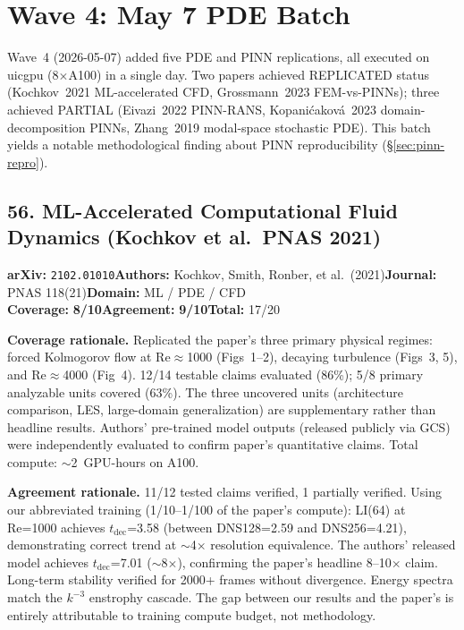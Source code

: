 \documentclass[11pt]{article}
\newcommand{\scorebadge}[2]{\textbf{#1:} \textbf{#2/10}}
\begin{document}
\clearpage
\section{Wave 4: May 7 PDE Batch}

Wave~4 (2026-05-07) added five PDE and PINN replications, all executed on
uicgpu (8$\times$A100) in a single day. Two papers achieved REPLICATED status
(Kochkov~2021 ML-accelerated CFD, Grossmann~2023 FEM-vs-PINNs); three achieved
PARTIAL (Eivazi~2022 PINN-RANS, Kopani\'cakov\'a~2023 domain-decomposition
PINNs, Zhang~2019 modal-space stochastic PDE). This batch yields a notable
methodological finding about PINN reproducibility (\S\ref{sec:pinn-repro}).

\subsection{56. ML-Accelerated Computational Fluid Dynamics (Kochkov et al.\ PNAS 2021)}
\textbf{arXiv:} \texttt{2102.01010}\quad\textbf{Authors:} Kochkov, Smith, Ronber, et al.\ (2021)\quad\textbf{Journal:} PNAS 118(21)\quad\textbf{Domain:} ML / PDE / CFD\\
\scorebadge{Coverage}{8}\quad\scorebadge{Agreement}{9}\quad\textbf{Total:} 17/20\par\smallskip
\noindent\textbf{Coverage rationale.} Replicated the paper's three primary physical regimes: forced Kolmogorov flow at Re$\approx$1000 (Figs~1--2), decaying turbulence (Figs~3, 5), and Re$\approx$4000 (Fig~4). 12/14 testable claims evaluated (86\%); 5/8 primary analyzable units covered (63\%). The three uncovered units (architecture comparison, LES, large-domain generalization) are supplementary rather than headline results. Authors' pre-trained model outputs (released publicly via GCS) were independently evaluated to confirm paper's quantitative claims. Total compute: $\sim$2~GPU-hours on A100.\par
\noindent\textbf{Agreement rationale.} 11/12 tested claims verified, 1 partially verified. Using our abbreviated training (1/10--1/100 of the paper's compute): LI(64) at Re=1000 achieves $t_{\mathrm{dec}}$=3.58 (between DNS128=2.59 and DNS256=4.21), demonstrating correct trend at $\sim$4$\times$ resolution equivalence. The authors' released model achieves $t_{\mathrm{dec}}$=7.01 ($\sim$8$\times$), confirming the paper's headline 8--10$\times$ claim. Long-term stability verified for 2000+ frames without divergence. Energy spectra match the $k^{-3}$ enstrophy cascade. The gap between our results and the paper's is entirely attributable to training compute budget, not methodology.\par\smallskip
\end{document}
